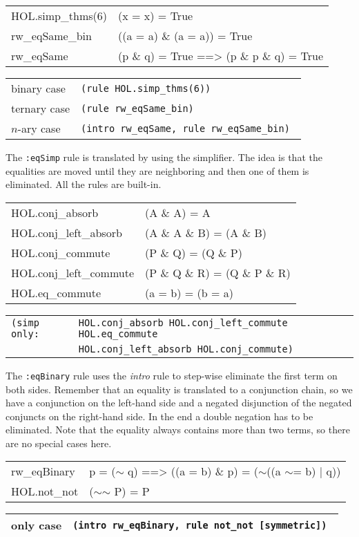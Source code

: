 \documentclass[10pt,a4paper]{article}
\newcommand{\ttt}{\texttt}
\newcommand{\negat}{\ensuremath{\sim}}
\newcommand{\nega}{\negat\xspace}
\newenvironment{pt}[1]{\begin{center}\begin{tt}\begin{tabular}{#1}\hline}{\end{tabular}\end{tt}\end{center}}
\newcommand{\pl}[1]{#1 \\[1mm]}
\newcommand{\pll}[1]{#1 \\\hline}
\newenvironment{rt}{\begin{center}\begin{tabular}{|l l|}\hline}{\end{tabular}\end{center}}
\newcommand{\rl}[2]{\rm{#1} & \tt{#2} \\[1mm]}
\newcommand{\rll}[2]{\rm{#1} & \tt{#2} \\\hline}
\def\ind{\quad}
\begin{document}
\begin{pt}{ll}
	\pl{HOL.simp\_thms(6) & (x = x) = True}
	\pl{rw\_eqSame\_bin & ((a = a) \& (a = a)) = True}
	\pll{rw\_eqSame & (p \& q) = True ==> (p \& p \& q) = True}
\end{pt}
%
\begin{rt}
	\rl{binary case}{(rule HOL.simp\_thms(6))}
	\rl{ternary case}{(rule rw\_eqSame\_bin)}
	\rll{$n$-ary case}{(intro rw\_eqSame, rule rw\_eqSame\_bin)}
\end{rt}

The \ttt{:eqSimp} rule is translated by using the simplifier. The idea is that the equalities are moved until they are neighboring and then one of them is eliminated. All the rules are built-in.
%
\begin{pt}{ll}
	\pl{HOL.conj\_absorb & (A \& A) = A}
	\pl{HOL.conj\_left\_absorb & (A \& A \& B) = (A \& B)}
	\pl{HOL.conj\_commute & (P \& Q) = (Q \& P)}
	\pl{HOL.conj\_left\_commute & (P \& Q \& R) = (Q \& P \& R)}
	\pll{HOL.eq\_commute & (a = b) = (b = a)}
\end{pt}
%
\begin{rt}
	\rl{\ttt{(simp only:}}{HOL.conj\_absorb HOL.conj\_left\_commute HOL.eq\_commute}
	\rll{}{\ind HOL.conj\_left\_absorb HOL.conj\_commute)}
\end{rt}

The \ttt{:eqBinary} rule uses the \emph{intro} rule to step-wise eliminate the first term on both sides. Remember that an equality is translated to a conjunction chain, so we have a conjunction on the left-hand side and a negated disjunction of the negated conjuncts on the right-hand side. In the end a double negation has to be eliminated. Note that the equality always contains more than two terms, so there are no special cases here.
%
\begin{pt}{ll}
	\pl{rw\_eqBinary & p = (\nega q) ==> ((a = b) \& p) = (\nega ((a \negat= b) | q))}
	\pll{HOL.not\_not & (\nega \nega P) = P}
\end{pt}
%
\begin{rt}
	\rll{only case}{(intro rw\_eqBinary, rule not\_not [symmetric])}
\end{rt}
\end{document}
